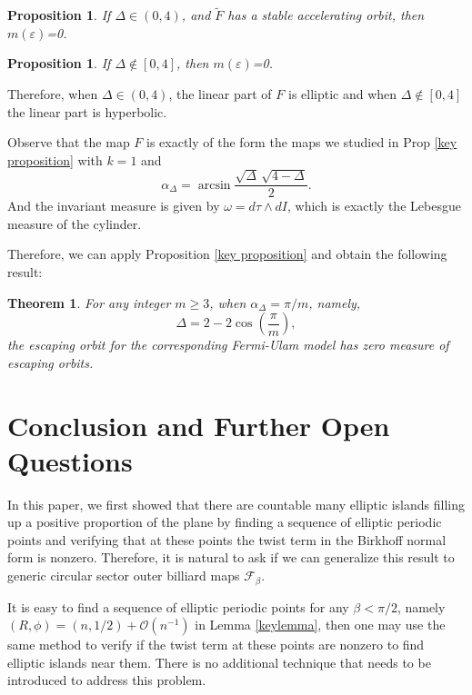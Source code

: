 \documentclass{article}
\numberwithin{figure}{section}
\numberwithin{equation}{section}
\newtheorem{theorem}{Theorem}
\newtheorem{proposition}[lemma]{Proposition}
\theoremstyle{remark}
\theoremstyle{definition}
\begin{document}
\begin{proposition}\label{cite1}
	If $\Delta \in \left(0,4\right)$, and $\tilde{F}$ has a stable accelerating orbit, then $m\left(\varepsilon\right)$=0.
\end{proposition} 



\begin{proposition}\label{cite2}
		If $\Delta \notin \left[0,4\right]$, then $m\left(\varepsilon\right)$=0.
\end{proposition} 

Therefore, when $\Delta \in \left(0,4\right)$, the linear part of $F$ is elliptic and when $\Delta \notin \left[0,4\right]$ the linear part is hyperbolic.


Observe that the map $F$ is exactly of the form the maps we studied in Prop \ref{key proposition} with $k=1$ and
$$\alpha_\Delta=\arcsin{\frac{\sqrt{\Delta }\,\sqrt{4-\Delta }}{2}}.$$
And the invariant measure is given by $\omega=d\tau \wedge dI$, which is exactly the Lebesgue measure of the cylinder.

Therefore, we can apply Proposition \ref{key proposition} and obtain the following result:
 
 \begin{theorem}
 	For any integer $m \geq 3$, when $\alpha_\Delta=\pi/m$, namely,
 	$$\Delta=2-2\cos\left(\frac{\pi}{m}\right),$$
 	the escaping orbit for the corresponding Fermi-Ulam model has zero measure of escaping orbits.
 \end{theorem}

\section{Conclusion and Further Open Questions}\label{Open questions}

In this paper, we first showed that there are countable many elliptic islands filling up a positive proportion of the plane by finding a sequence of elliptic periodic points and verifying that at these points the twist term in the Birkhoff normal form is nonzero. Therefore, it is natural to ask if we can generalize this result to generic circular sector outer billiard maps $\mathcal{F}_\beta$.

It is easy to find a sequence of elliptic periodic points for any $\beta<\pi/2$, namely $(R,\phi)=(n,1/2)+\mathcal{O}(n^{-1})$ in Lemma \ref{keylemma}, then one may use the same method to verify if the twist term at these points are nonzero to find elliptic islands near them. There is no additional technique that needs to be introduced to address this problem.
\end{document}
